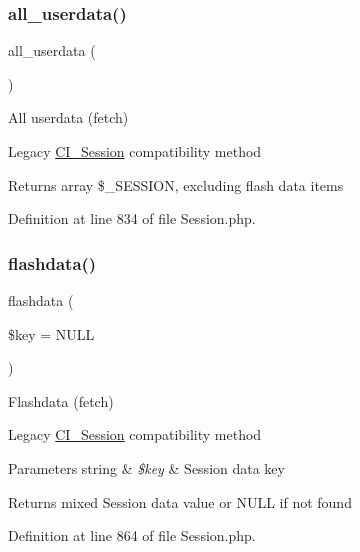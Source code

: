 \subsubsection{\texorpdfstring{all\_userdata()}{all\_userdata()}}
{\footnotesize\ttfamily all\+\_\+userdata (\begin{DoxyParamCaption}{ }\end{DoxyParamCaption})}

All userdata (fetch)

Legacy \mbox{\hyperlink{class_c_i___session}{C\+I\+\_\+\+Session}} compatibility method

\begin{DoxyReturn}{Returns}
array \$\+\_\+\+S\+E\+S\+S\+I\+ON, excluding flash data items 
\end{DoxyReturn}


Definition at line 834 of file Session.\+php.

\mbox{\label{class_c_i___session_acc27ddf9dd242d2c887eca2504136cff}} 
\subsubsection{\texorpdfstring{flashdata()}{flashdata()}}
{\footnotesize\ttfamily flashdata (\begin{DoxyParamCaption}\item[{}]{\$key = {\ttfamily NULL} }\end{DoxyParamCaption})}

Flashdata (fetch)

Legacy \mbox{\hyperlink{class_c_i___session}{C\+I\+\_\+\+Session}} compatibility method


\begin{DoxyParams}[1]{Parameters}
string & {\em \$key} & Session data key \\
\hline
\end{DoxyParams}
\begin{DoxyReturn}{Returns}
mixed Session data value or N\+U\+LL if not found 
\end{DoxyReturn}


Definition at line 864 of file Session.\+php.

\mbox{\label{class_c_i___session_a996e70387750cdc480712c1585743d8d}} 
